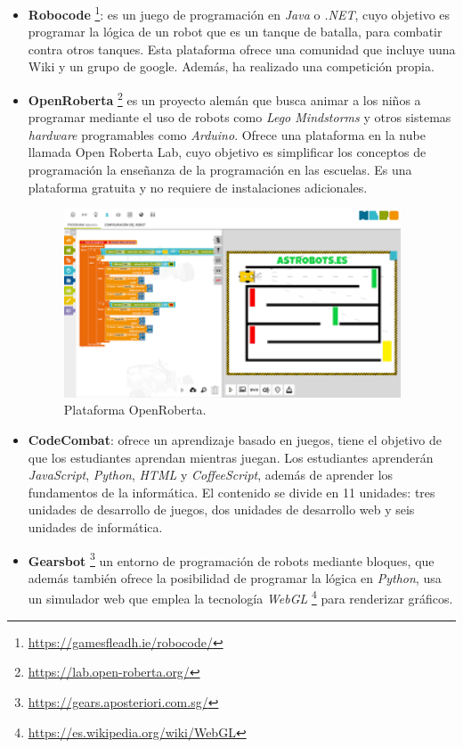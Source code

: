 \documentclass[a4paper, 12pt]{book}
\begin{document}
\begin{itemize}
\item \textbf{Robocode} \footnote{\url{https://gamesfleadh.ie/robocode/}}: es un juego de programación en \emph{Java} o \emph{.NET}, cuyo objetivo es programar la lógica de un robot que es un tanque de batalla, para combatir contra otros tanques. Esta plataforma ofrece una comunidad que incluye uuna Wiki y un grupo de google. Además, ha realizado una competición propia.
\item \textbf{OpenRoberta} \footnote{\url{https://lab.open-roberta.org/}} es un proyecto alemán que busca animar a los niños a programar mediante el uso de robots como \emph{Lego Mindstorms} y otros sistemas \emph{hardware} programables como \emph{Arduino}. Ofrece una plataforma en la nube llamada Open Roberta Lab, cuyo objetivo es simplificar los conceptos de programación la enseñanza de la programación en las escuelas. Es una plataforma gratuita y no requiere de instalaciones adicionales.

\begin{figure}[H]
	\centering
    \includegraphics[width=10cm]{img/roberta.png}
    \caption{Plataforma OpenRoberta.}
\end{figure}

\item \textbf{CodeCombat}: ofrece un aprendizaje basado en juegos, tiene el objetivo de que los estudiantes aprendan mientras juegan. Los estudiantes aprenderán \emph{JavaScript}, \emph{Python}, \emph{HTML} y \emph{CoffeeScript}, además de aprender los fundamentos de la informática. El contenido se divide en 11 unidades: tres unidades de desarrollo de juegos, dos unidades de desarrollo web y seis unidades de informática.
\item \textbf{Gearsbot} \footnote{\url{https://gears.aposteriori.com.sg/}} un entorno de programación de robots mediante bloques, que además también ofrece la posibilidad de programar la lógica en \emph{Python}, usa un simulador web que emplea la tecnología \emph{WebGL} \footnote{\url{https://es.wikipedia.org/wiki/WebGL}} para renderizar gráficos.
\end{itemize}
\end{document}
